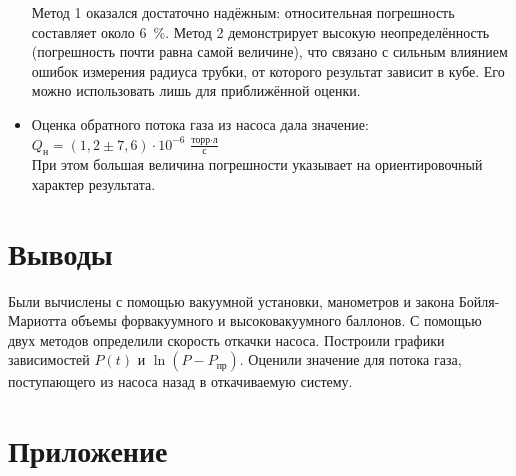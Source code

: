 \documentclass[a4paper,12pt]{article}
\begin{document}
\begin{itemize}
Метод 1 оказался достаточно надёжным: относительная погрешность составляет около 6~\%. Метод 2 демонстрирует высокую неопределённость (погрешность почти равна самой величине), что связано с сильным влиянием ошибок измерения радиуса трубки, от которого результат зависит в кубе. Его можно использовать лишь для приближённой оценки.

\item Оценка обратного потока газа из насоса дала значение: \\[0.5ex]
\begin{math}
    Q_\text{н} = (1{,}2 \pm 7{,}6) \cdot 10^{-6} \ \frac{\text{торр} \cdot \text{л}}{\text{с}}
\end{math} \\[0.5ex]
При этом большая величина погрешности указывает на ориентировочный характер результата.

\end{itemize}

    \section{Выводы}
Были вычислены с помощью вакуумной установки, манометров и закона Бойля-Мариотта объемы форвакуумного и высоковакуумного баллонов. С помощью двух методов определили скорость откачки насоса. Построили графики зависимостей $P(t)$ и $\ln(P - P_\text{пр})$. Оценили значение для потока газа, поступающего из насоса назад в откачиваемую систему.


    \section{Приложение}
\end{document}
